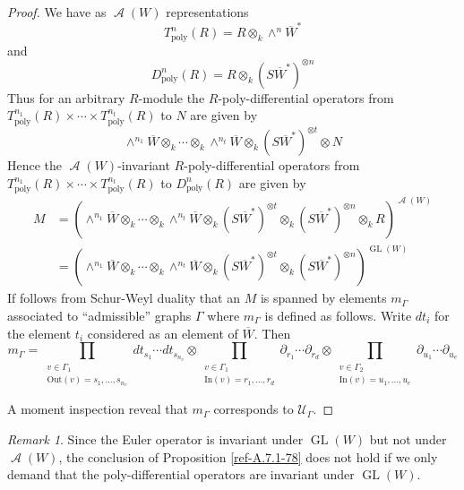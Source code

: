\documentclass{amsart}
\numberwithin{equation}{section}
\let\cal\mathcal
\theoremstyle{definition}
\theoremstyle{remark}
\newtheorem{remarks}[lemmas]{Remark}
\begin{document}
\begin{proof}
We have
as ${\operatorname{{\cal A}}}(W)$ representations
\[
T^n_{\operatorname{poly}}(R)=R\otimes_k \wedge^n\overline{W}^\ast
\]
and 
\[
D^n_{\operatorname{poly}}(R)=R\otimes_k (S\overline{W}^\ast)^{\otimes n}
\]
Thus for an arbitrary $R$-module the $R$-poly-differential operators from
$T^{n_1}_{\operatorname{poly}}(R)\times\cdots \times T^{n_t}_{\operatorname{poly}}(R)$ to $N$ are
given by
\[
\wedge^{n_1}\overline{W}\otimes_k\cdots\otimes_k
  \wedge^{n_t}\overline{W} \otimes_k (S\overline{W}^\ast)^{\otimes t}\otimes N
\]
Hence the ${\operatorname{{\cal A}}}(W)$-invariant $R$-poly-differential operators
from
$T^{n_1}_{\operatorname{poly}}(R)\times\cdots \times T^{n_t}_{\operatorname{poly}}(R)$ to $D^n_{\operatorname{poly}}(R)$
are given by
\begin{align*}
  M&=(\wedge^{n_1}\overline{W}\otimes_k\cdots\otimes_k
  \wedge^{n_t}\overline{W} \otimes_k (S\overline{W}^\ast)^{\otimes t}
  \otimes_k(S\overline{W}^\ast)^{\otimes n} \otimes_k R)^{{\operatorname{{\cal A}}}(W)}\\
&=(\wedge^{n_1}\overline{W}\otimes_k\cdots\otimes_k
  \wedge^{n_t}\overline{W} \otimes_k (S\overline{W}^\ast)^{\otimes t}
  \otimes_k(S\overline{W}^\ast)^{\otimes n})^{{\operatorname {GL}}(W)}
\end{align*}
If follows from Schur-Weyl duality that an $M$ is spanned by elements
$m_\Gamma$ associated to ``admissible'' graphs $\Gamma$ where
$m_\Gamma$ is defined as follows.  Write $dt_i$ for the element $t_i$
considered as an element of $\overline{W}$. Then
\[
m_\Gamma=\prod_{\begin{smallmatrix}v\in \Gamma_1\\
\text{Out}(v)={s_1,\ldots,s_{n_v}}\end{smallmatrix}}
dt_{s_1}\cdots dt_{s_{n_v}}
\otimes 
\prod_{\begin{smallmatrix}v\in \Gamma_1\\
\text{In}(v)={r_1,\ldots,r_d}
\end{smallmatrix}}
\partial_{{r_1}}\cdots \partial_{{r_d}}
\otimes 
\prod_{\begin{smallmatrix}
v\in \Gamma_2\\
\text{In}(v)={u_1,\ldots,u_e}
\end{smallmatrix}
}
\partial_{{u_1}}\cdots \partial_{{u_e}}
\]

A moment inspection reveal that $m_\Gamma$ corresponds to ${{\cal U}}_\Gamma$.
\end{proof}
\begin{remarks} Since the Euler operator is invariant under
${\operatorname {GL}}(W)$ but not under ${\operatorname{{\cal A}}}(W)$, the conclusion of 
Proposition \eqref{ref-A.7.1-78} does not hold if we only demand that the
poly-differential operators are invariant under ${\operatorname {GL}}(W)$. 
\end{remarks}
\end{document}
